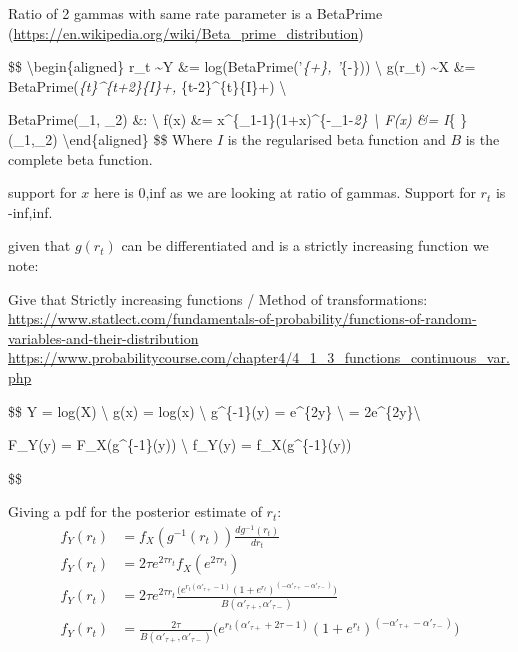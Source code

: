 \documentclass[
]{article}
\begin{document}
Ratio of 2 gammas with same rate parameter is a BetaPrime
(\url{https://en.wikipedia.org/wiki/Beta_prime_distribution})

\$\$ \textbackslash begin\{aligned\} r\_t \sim Y \&=
log\Big(BetaPrime\big(\alpha'\emph{\{\tau+\},
\alpha'}\{\tau-\})\Big) \textbackslash{} g(r\_t) \sim X \&=
BetaPrime\big(\sum\emph{\{t\}\^{}\{t+2\tau\}\{I\}+\alpha,
\sum}\{t-2\tau\}\^{}\{t\}\{I\}+\alpha\big) \textbackslash{}

BetaPrime(\alpha\_1, \alpha\_2) \&: \textbackslash{} f(x) \&=
x\^{}\{\alpha\_1-1\}(1+x)\^{}\{-\alpha\_1-\alpha\emph{2\}
\textbackslash{} F(x) \&= I}\{ \}(\alpha\_1,\alpha\_2)
\textbackslash end\{aligned\} \$\$ Where \(I\) is the regularised beta
function and \(B\) is the complete beta function.

support for \(x\) here is 0,inf as we are looking at ratio of gammas.
Support for \(r_t\) is -inf,inf.

given that \(g(r_t)\) can be differentiated and is a strictly increasing
function we note:

Give that Strictly increasing functions / Method of transformations:
\url{https://www.statlect.com/fundamentals-of-probability/functions-of-random-variables-and-their-distribution}
\url{https://www.probabilitycourse.com/chapter4/4_1_3_functions_continuous_var.php}

\$\$ Y = log(X) \textbackslash{} g(x) =
log(x) \textbackslash{} g\^{}\{-1\}(y) = e\^{}\{2\tau y\}
\textbackslash{}  =
2\tau e\^{}\{2\tau y\}\textbackslash{}

F\_Y(y) = F\_X(g\^{}\{-1\}(y)) \textbackslash{} f\_Y(y) =
f\_X(g\^{}\{-1\}(y)) 

\$\$

Giving a pdf for the posterior estimate of \(r_t\): \[
\begin{aligned}
f_Y(r_t) &= f_X(g^{-1}(r_t))\frac{dg^{-1}(r_t)}{dr_t}\\
f_Y(r_t) &= 2\tau e^{2\tau r_t}f_X(e^{2\tau r_t})\\
f_Y(r_t) &=  2\tau e^{2\tau r_t}\frac{
\Big(
  e^{r_t(\alpha'_{\tau+}-1)}
  (1+e^{r_t})^{(-\alpha'_{\tau+}-\alpha'_{\tau-})}
\Big)}{B(\alpha'_{\tau+}, \alpha'_{\tau-})}\\
f_Y(r_t) &=  \frac{2\tau}{B(\alpha'_{\tau+}, \alpha'_{\tau-})}
\Big(
  e^{r_t(\alpha'_{\tau+}+2\tau-1)}
  (1+e^{r_t})^{(-\alpha'_{\tau+}-\alpha'_{\tau-})}
\Big)\\
\end{aligned}
\]
\end{document}
